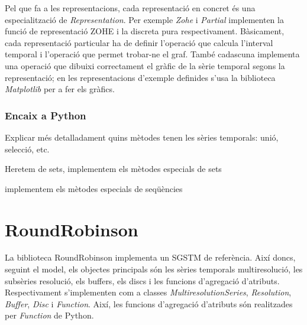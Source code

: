 Pel que fa a les representacions, cada representació en concret és una
especialització de \emph{Representation}. Per exemple \emph{Zohe} i
\emph{Partial} implementen la funció de representació ZOHE i la
discreta pura respectivament. 
Bàsicament, cada representació particular ha de definir l'operació que
calcula l'interval temporal i l'operació que permet trobar-ne el graf.
També cadascuna implementa una operació que dibuixi correctament el
gràfic de la sèrie temporal segons la representació; en les
representacions d'exemple definides s'usa la biblioteca
\emph{Matplotlib}  per a fer els gràfics.




\subsubsection{Encaix a Python}

\todo{}

Explicar més detalladament quins mètodes tenen les sèries temporals: unió, selecció, etc.

Heretem de sets, implementem els mètodes especials de sets

implementem els mètodes especials de seqüències







\section{RoundRobinson}

La biblioteca RoundRobinson implementa un SGSTM de referència. Així
doncs, seguint el model, els objectes principals són les sèries
temporals multiresolució, les subsèries resolució, els buffers, els
discs i les funcions d'agregació d'atributs. Respectivament
s'implementen com a classes \emph{MultiresolutionSeries},
\emph{Resolution}, \emph{Buffer}, \emph{Disc} i \emph{Function}.
Així, les funcions d'agregació d'atributs són realitzades per
\emph{Function} de Python.


